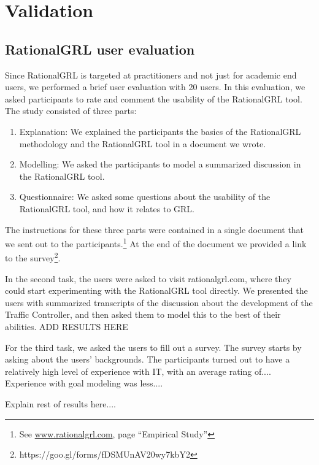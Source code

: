 \section{Validation}
\label{sect:validation}

\subsection{RationalGRL user evaluation}

Since RationalGRL is targeted at practitioners and not just for academic end users, we performed a brief user evaluation with 20 users. In this evaluation, we asked participants to rate and comment the usability of the RationalGRL tool. The study consisted of three parts:
\begin{enumerate}
\item Explanation: We explained the participants the basics of the RationalGRL methodology and the RationalGRL tool in a document we wrote.
\item Modelling: We asked the participants to model a summarized discussion in the RationalGRL tool.
\item Questionnaire: We asked some questions about the usability of the RationalGRL tool, and how it relates to GRL.
\end{enumerate}

The instructions for these three parts were contained in a single document that we sent out to the participants.\footnote{See \url{www.rationalgrl.com}, page ``Empirical Study''} At the end of the document we provided a link to the survey\footnote{https://goo.gl/forms/fDSMUnAV20wy7kbY2}.

In the second task, the users were asked to visit rationalgrl.com, where they could start experimenting with the RationalGRL tool directly. We presented the users with summarized transcripts of the discussion about the development of the Traffic Controller, and then asked them to model this to the best of their abilities. ADD RESULTS HERE

For the third task, we asked the users to fill out a survey. The survey starts by asking about the users’ backgrounds. The participants turned out to have a relatively high level of experience with
IT, with an average rating of.... Experience
with goal modeling was less....

Explain rest of results here....



